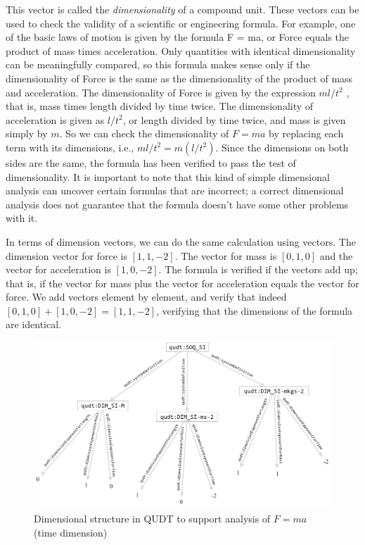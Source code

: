 This vector is called the \emph{dimensionality} of a compound unit. These
vectors can be used to check the validity of a scientific or engineering
formula. For example, one of the basic laws of motion is given by the
formula F = ma, or Force equals the product of mass times acceleration.
Only quantities with identical dimensionality can be meaningfully
compared, so this formula makes sense only if the dimensionality of
Force is the same as the dimensionality of the product of mass and
acceleration. The dimensionality of Force is given by the expression
$ml/{t^2}$ , that is, mass times length divided by time twice. The
dimensionality of acceleration is given as $l/{t^2}$, or length divided by
time twice, and mass is given simply by $m$. So we can check the
dimensionality of $F = ma$ by replacing each term with its dimensions,
i.e., ${ml}/{t^2} = m(l/{t^2})$. Since the dimensions on both sides are the
same, the formula has been verified to pass the test of dimensionality.
It is important to note that this kind of simple dimensional analysis
can uncover certain formulas that are incorrect; a correct dimensional
analysis does not guarantee that the formula doesn't have some other
problems with it.

In terms of dimension vectors, we can do the same calculation using
vectors. The dimension vector for force is $[1, 1, -2]$. The vector
for mass is $[0, 1, 0]$ and the vector for acceleration is $[1, 0,
-2]$. The formula is verified if the vectors add up; that is, if the
vector for mass plus the vector for acceleration
equals the vector for force. We add vectors element by element, and
verify that indeed $[0, 1, 0] + [1, 0, -2] = [1, 1, -2]$, verifying that the dimensions of the
formula are identical.


\begin{figure}
\centering
\includegraphics[width=5in]{SWWOv3/media/ch14/figure14-1.png}
\caption{Dimensional structure in QUDT to support analysis of $F=ma$ (time
dimension)}
\label{fig:ch14.04}
\end{figure}






